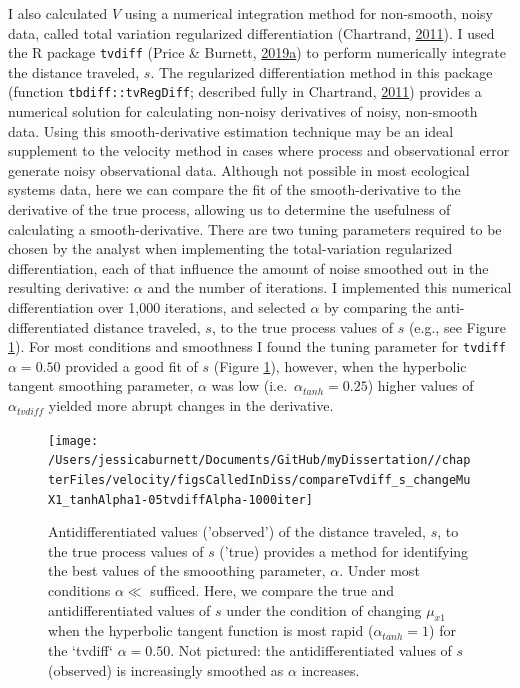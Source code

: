 \documentclass[12pt,twoside,openany]{reedthesis}
\begin{document}
I also calculated \(V\) using a numerical integration method for non-smooth, noisy data, called total variation regularized differentiation (Chartrand, \protect\hyperlink{ref-chartrand2011numerical}{2011}). I used the R package \texttt{tvdiff} (Price \& Burnett, \protect\hyperlink{ref-price2019tvdiff}{2019}\protect\hyperlink{ref-price2019tvdiff}{a}) to perform numerically integrate the distance traveled, \(s\). The regularized differentiation method in this package (function \texttt{tbdiff::tvRegDiff}; described fully in Chartrand, \protect\hyperlink{ref-chartrand2011numerical}{2011}) provides a numerical solution for calculating non-noisy derivatives of noisy, non-smooth data. Using this smooth-derivative estimation technique may be an ideal supplement to the velocity method in cases where process and observational error generate noisy observational data. Although not possible in most ecological systems data, here we can compare the fit of the smooth-derivative to the derivative of the true process, allowing us to determine the usefulness of calculating a smooth-derivative. There are two tuning parameters required to be chosen by the analyst when implementing the total-variation regularized differentiation, each of that influence the amount of noise smoothed out in the resulting derivative: \(\alpha\) and the number of iterations. I implemented this numerical differentiation over 1,000 iterations, and selected \(\alpha\) by comparing the anti-differentiated distance traveled, \(s\), to the true process values of \(s\) (e.g., see Figure \ref{fig:antiDiffComp}). For most conditions and smoothness I found the tuning parameter for \texttt{tvdiff} \(\alpha=0.50\) provided a good fit of \(s\) (Figure \ref{fig:antiDiffComp}), however, when the hyperbolic tangent smoothing parameter, \(\alpha\) was low (i.e.~\(\alpha_{tanh}=0.25\)) higher values of \(\alpha_{tvdiff}\) yielded more abrupt changes in the derivative.
\begin{figure}[bth]

{\centering \texttt{[image: /Users/jessicaburnett/Documents/GitHub/myDissertation//chapterFiles/velocity/figsCalledInDiss/compareTvdiff\_s\_changeMuX1\_tanhAlpha1-05tvdiffAlpha-1000iter]} 

}

\caption{Antidifferentiated values ('observed') of the distance traveled, $s$, to the true process values of $s$ ('true) provides a method for identifying the best values of the smooothing parameter, $\alpha$. Under most conditions $\alpha \ll$ sufficed. Here, we compare the true and antidifferentiated values of $s$ under the condition of changing $\mu_{x1}$ when the hyperbolic tangent function is most rapid ($\alpha_{tanh}=1$) for the `tvdiff` $\alpha=0.50$. Not pictured: the antidifferentiated values of $s$ (observed) is increasingly smoothed as $\alpha$ increases.}\label{fig:antiDiffComp}
\end{figure}
\end{document}
